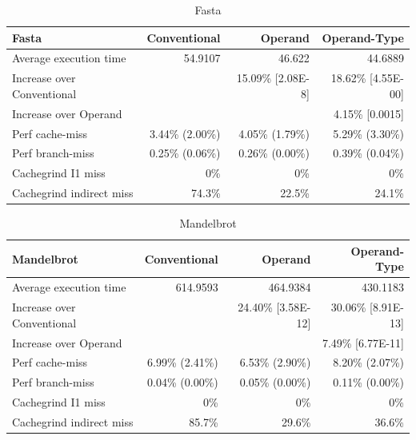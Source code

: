 \documentclass[english,a4paper,12pt]{report}
\begin{document}
\begin{table}[!htb]
  \begin{center}
    \begin{tabular}{lrrr}
      Fasta & Conventional & Operand & Operand-Type\\
      \hline
      Average execution time & 54.9107 & 46.622 & 44.6889\\
      Increase over Conventional &  & 15.09\% [2.08E-8] & 18.62\% [4.55E-00]\\
      Increase over Operand &  &  & 4.15\% [0.0015]\\
      Perf cache-miss & 3.44\% (2.00\%) & 4.05\% (1.79\%) & 5.29\% (3.30\%)\\
      Perf branch-miss & 0.25\% (0.06\%) & 0.26\% (0.00\%) & 0.39\% (0.04\%)\\
      Cachegrind I1 miss & 0\% & 0\% & 0\%\\
      Cachegrind indirect miss & 74.3\% & 22.5\% & 24.1\%\\
    \end{tabular}
  \end{center}
  \caption{Fasta}
\end{table}

\begin{table}[!htb]
  \begin{center}
    \begin{tabular}{lrrr}
      Mandelbrot & Conventional & Operand & Operand-Type\\
      \hline
      Average execution time & 614.9593 & 464.9384 & 430.1183\\
      Increase over Conventional &  & 24.40\% [3.58E-12] & 30.06\% [8.91E-13]\\
      Increase over Operand &  &  & 7.49\% [6.77E-11]\\
      Perf cache-miss & 6.99\% (2.41\%) & 6.53\% (2.90\%) & 8.20\% (2.07\%)\\
      Perf branch-miss & 0.04\% (0.00\%) & 0.05\% (0.00\%) & 0.11\% (0.00\%)\\
      Cachegrind I1 miss & 0\% & 0\% & 0\%\\
      Cachegrind indirect miss & 85.7\% & 29.6\% & 36.6\%\\
    \end{tabular}
  \end{center}
  \caption{Mandelbrot}
\end{table}
\end{document}
